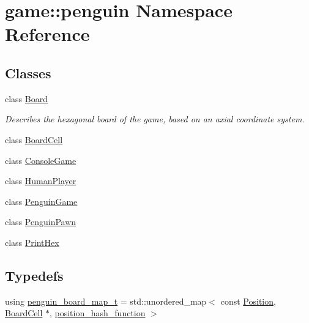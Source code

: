 \hypertarget{namespacegame_1_1penguin}{}\section{game\+:\+:penguin Namespace Reference}
\label{namespacegame_1_1penguin}
\subsection*{Classes}
\begin{DoxyCompactItemize}
\item 
class \hyperlink{classgame_1_1penguin_1_1_board}{Board}
\begin{DoxyCompactList}\small\item\em Describes the hexagonal board of the game, based on an axial coordinate system. \end{DoxyCompactList}\item 
class \hyperlink{classgame_1_1penguin_1_1_board_cell}{Board\+Cell}
\item 
class \hyperlink{classgame_1_1penguin_1_1_console_game}{Console\+Game}
\item 
class \hyperlink{classgame_1_1penguin_1_1_human_player}{Human\+Player}
\item 
class \hyperlink{classgame_1_1penguin_1_1_penguin_game}{Penguin\+Game}
\item 
class \hyperlink{classgame_1_1penguin_1_1_penguin_pawn}{Penguin\+Pawn}
\item 
class \hyperlink{classgame_1_1penguin_1_1_print_hex}{Print\+Hex}
\end{DoxyCompactItemize}
\subsection*{Typedefs}
\begin{DoxyCompactItemize}
\item 
using \hyperlink{namespacegame_1_1penguin_a6ea7c0fc4c04931bf39fcac439c92735}{penguin\+\_\+board\+\_\+map\+\_\+t} = std\+::unordered\+\_\+map$<$ const \hyperlink{structgame_1_1_position}{Position}, \hyperlink{classgame_1_1penguin_1_1_board_cell}{Board\+Cell} $\ast$, \hyperlink{structgame_1_1position__hash__function}{position\+\_\+hash\+\_\+function} $>$
\end{DoxyCompactItemize}
